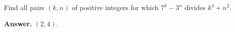 Find all pairs $(k, n)$ of positive integers for which $7^{k} - 3^{n}$ divides $k^{4} + n^{2}$.

\textbf{Answer.} $(2, 4)$.
